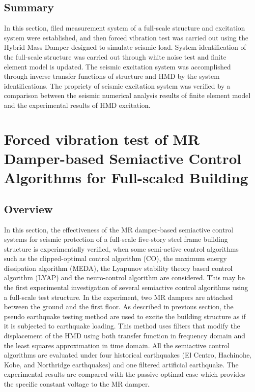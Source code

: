 \subsection{Summary}
In this section, filed measurement system of a full-scale structure and excitation system were established, and then forced vibration test was carried out using the Hybrid Mass Damper designed to simulate seismic load. System identification of the full-scale structure was carried out through white noise test and finite element model is updated. The seismic excitation system was accomplished through inverse transfer functions of structure and HMD by the system identifications. The propriety of seismic excitation system was verified by a comparison between the seismic numerical analysis results of finite element model and the experimental results of HMD excitation.



\section{Forced vibration test of MR Damper-based Semiactive Control Algorithms for Full-scaled Building}
\label{chap:expmr}
\subsection{Overview}

In this section, the effectiveness of the MR damper-based semiactive control systems for seismic protection of a full-scale five-story steel frame building structure is experimentally verified, when some semi-active control algorithms such as the clipped-optimal control algorithm (CO), the maximum energy dissipation algorithm (MEDA), the Lyapunov stability theory based control algorithm (LYAP) and the neuro-control algorithm are considered. This may be the first experimental investigation of several semiactive control algorithms using a full-scale test structure. In the experiment, two MR dampers are attached between the ground and the first floor. As described in previous section, the pseudo earthquake testing method are used to excite the building structure as if it is subjected to earthquake loading. This method uses filters that modify the displacement of the HMD using both transfer function in frequency domain and the least squares approximation in time domain. All the semiactive control algorithms are evaluated under four historical earthquakes (El Centro, Hachinohe, Kobe, and Northridge earthquakes) and one filtered artificial earthquake. The experimental results are compared with the passive optimal case which provides the specific constant voltage to the MR damper.


